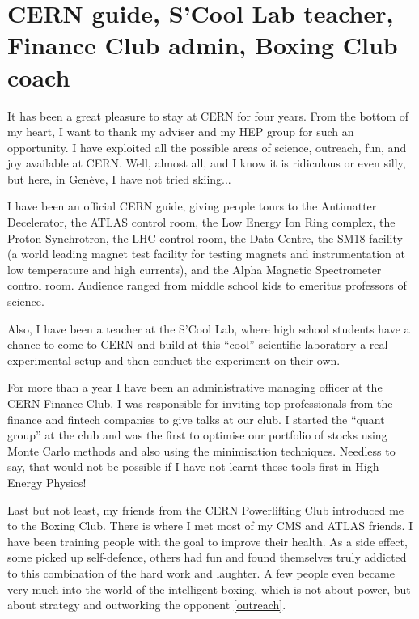 \clearpage

\section*{CERN guide, S'Cool Lab teacher, Finance Club admin, Boxing Club coach}
\small

It has been a great pleasure to stay at CERN for four years. From the bottom of my heart, I want to thank my adviser and my HEP group for such an opportunity. I have exploited all the possible areas of science, outreach, fun, and joy available at CERN. Well, almost all, and I know it is ridiculous or even silly, but here, in Gen\`eve, I have not tried skiing...

I have been an official CERN guide, giving people tours to the Antimatter Decelerator, the ATLAS control room, the Low Energy Ion Ring complex, the Proton Synchrotron, the LHC control room, the Data Centre, the SM18 facility (a world leading magnet test facility for testing magnets and instrumentation at low temperature and high currents), and the Alpha Magnetic Spectrometer control room. Audience ranged from middle school kids to emeritus professors of science. 

Also, I have been a teacher at the S'Cool Lab, where high school students have a chance to come to CERN and build at this ``cool'' scientific laboratory a real experimental setup and then conduct the experiment on their own. 

For more than a year I have been an administrative managing officer at the CERN Finance Club. I was responsible for inviting top professionals from the finance and fintech companies to give talks at our club. I started the ``quant group'' at the club and was the first to optimise our portfolio of stocks using Monte Carlo methods and also using the minimisation techniques. Needless to say, that would not be possible if I have not learnt those tools first in High Energy Physics!

Last but not least, my friends from the CERN Powerlifting Club introduced me to the Boxing Club. There is where I met most of my CMS and ATLAS friends. I have been training people with the goal to improve their health. As a side effect, some picked up self-defence, others had fun and found themselves truly addicted to this combination of the hard work and laughter. A few people even became very much into the world of the intelligent boxing, which is not about power, but about strategy and outworking the opponent \ref{outreach}. 



